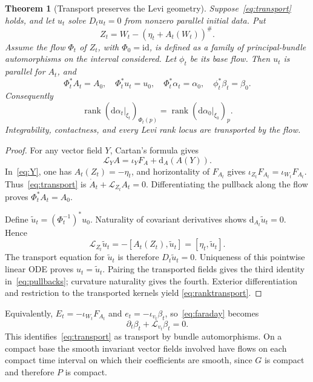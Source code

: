 \documentclass[11pt,a4paper]{article}
\numberwithin{equation}{section}
\newtheorem{theorem}{Theorem}[section]
\theoremstyle{definition}
\theoremstyle{remark}
\newcommand{\D}{\xi}
\newcommand{\rank}{\operatorname{rank}}
\newcommand{\Lie}{\mathcal L}
\newcommand{\dd}{\mathrm d}
\begin{document}
\begin{theorem}[Transport preserves the Levi geometry]\label{thm:transport}
Suppose~\eqref{eq:transport} holds, and let $u_t$ solve
$D_tu_t=0$ from nonzero parallel initial data. Put
\begin{equation}\label{eq:Y}
 Z_t=W_t-(\eta_t+A_t(W_t))^\#.
\end{equation}
Assume the flow $\Phi_t$ of $Z_t$, with $\Phi_0=\mathrm{id}$, is
defined as a family of principal-bundle automorphisms on the interval
considered. Let $\phi_t$ be its base flow. Then $u_t$ is parallel for $A_t$, and
\begin{equation}\label{eq:pullbacks}
 \Phi_t^*A_t=A_0,\quad \Phi_t^*u_t=u_0,\quad
 \Phi_t^*\alpha_t=\alpha_0,\quad \phi_t^*\beta_t=\beta_0.
\end{equation}
Consequently
\begin{equation}\label{eq:ranktransport}
 \rank(\dd\alpha_t|_{\D_t})_{\Phi_t(p)}
 =\rank(\dd\alpha_0|_{\D_0})_p.
\end{equation}
Integrability, contactness, and every Levi rank locus are transported by the
flow.
\end{theorem}

\begin{proof}
For any vector field $Y$, Cartan's formula gives
\begin{equation}\label{eq:cartan}
 \Lie_YA=\iota_YF_A+\dd_A(A(Y)).
\end{equation}
In~\eqref{eq:Y}, one has $A_t(Z_t)=-\eta_t$, and horizontality of
$F_{A_t}$ gives $\iota_{Z_t}F_{A_t}=\iota_{W_t}F_{A_t}$.
Thus~\eqref{eq:transport} is
$\dot A_t+\Lie_{Z_t}A_t=0$. Differentiating the pullback along the flow
proves $\Phi_t^*A_t=A_0$.

Define $\widetilde u_t=(\Phi_t^{-1})^*u_0$. Naturality of covariant
derivatives shows $\dd_{A_t}\widetilde u_t=0$. Hence
\[
 \Lie_{Z_t}\widetilde u_t
 =-[A_t(Z_t),\widetilde u_t]=[\eta_t,\widetilde u_t].
\]
The transport equation for $\widetilde u_t$ is therefore
$D_t\widetilde u_t=0$. Uniqueness of this pointwise linear ODE proves
$u_t=\widetilde u_t$. Pairing the transported fields gives the third
identity in~\eqref{eq:pullbacks}; curvature naturality gives the fourth.
Exterior differentiation and restriction to the transported kernels yield
\eqref{eq:ranktransport}.
\end{proof}

Equivalently, $E_t=-\iota_{W_t}F_{A_t}$ and
$e_t=-\iota_{v_t}\beta_t$, so~\eqref{eq:faraday} becomes
\[
 \partial_t\beta_t+\Lie_{v_t}\beta_t=0.
\]
This identifies~\eqref{eq:transport} as transport by bundle automorphisms.
On a compact base the smooth invariant vector fields involved have flows
on each compact time interval on which their coefficients are smooth,
since $G$ is compact and therefore $P$ is compact.
\end{document}
